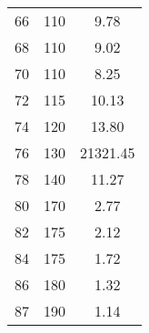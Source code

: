 \begin{table}[H]
\begin{tabular}{S[table-format=2.0] S S[table-format=2.2]}
    66 & 110 &  9.78\\
    68 & 110 &  9.02\\
    70 & 110 &  8.25\\
    72 & 115 &  10.13\\
    74 & 120 &  13.80\\
    76 & 130 &  21321.45\\
    78 & 140 &  11.27\\
    80 & 170 &  2.77\\
    82 & 175 &  2.12\\
    84 & 175 &  1.72\\
    86 & 180 &  1.32\\
    87 & 190 &  1.14\\
   \bottomrule
  \end{tabular}
\end{table}


